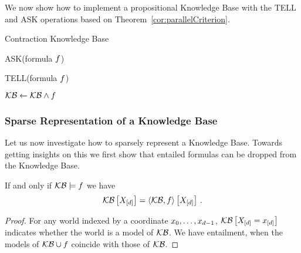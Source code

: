 We now show how to implement a propositional Knowledge Base with the TELL and ASK operations based on Theorem~\ref{cor:parallelCriterion}.

\begin{algorithm}[hbt!]
\caption{Contraction Knowledge Base}\label{alg:TensorKB}
ASK(formula $f$)
\begin{algorithmic}
	\State{$\hypercoreat{\formulavar} \algdefsymbol \sbcontractionof{\kb,\rencodingof{\exformula}}{\formulavar}$}
	\EndIf
	\EndIf
\end{algorithmic}
TELL(formula $f$)
\begin{algorithmic}
	\State $\mathcal{KB} \leftarrow \mathcal{KB}\land f$%
	\EndIf
\end{algorithmic}

\end{algorithm}




\subsubsection{Sparse Representation of a Knowledge Base}

Let us now investigate how to sparsely represent a Knowledge Base.
Towards getting insights on this we first show that entailed formulas can be dropped from the Knowledge Base.

\begin{theorem}\label{the:ReduncancyOfEntailed}
	If and only if $\mathcal{KB} \models f$ we have
		\[ \mathcal{KB}\left[X_{[d]}\right]= \left\langle \mathcal{KB},f\right\rangle \left[ X_{[d]} \right]  \, . \]
\end{theorem}
\begin{proof}
	For any world indexed by a coordinate ${x_{0},\ldots,x_{d-1}}$, $\mathcal{KB}\left[X_{[d]}=x_{[d]}\right]$ indicates whether the world is a model of $\mathcal{KB}$.
	We have entailment, when the models of $\mathcal{KB}\cup f$ coincide with those of $\mathcal{KB}$.
\end{proof}


